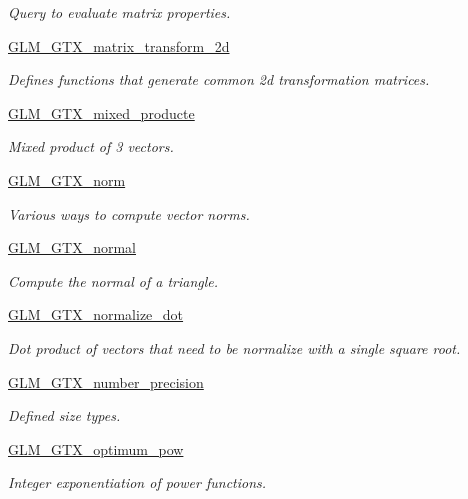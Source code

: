 \begin{DoxyCompactItemize}
\begin{DoxyCompactList}\small\item\em Query to evaluate matrix properties. \end{DoxyCompactList}\item 
\hyperlink{group__gtx__matrix__transform__2d}{G\+L\+M\+\_\+\+G\+T\+X\+\_\+matrix\+\_\+transform\+\_\+2d}
\begin{DoxyCompactList}\small\item\em Defines functions that generate common 2d transformation matrices. \end{DoxyCompactList}\item 
\hyperlink{group__gtx__mixed__product}{G\+L\+M\+\_\+\+G\+T\+X\+\_\+mixed\+\_\+producte}
\begin{DoxyCompactList}\small\item\em Mixed product of 3 vectors. \end{DoxyCompactList}\item 
\hyperlink{group__gtx__norm}{G\+L\+M\+\_\+\+G\+T\+X\+\_\+norm}
\begin{DoxyCompactList}\small\item\em Various ways to compute vector norms. \end{DoxyCompactList}\item 
\hyperlink{group__gtx__normal}{G\+L\+M\+\_\+\+G\+T\+X\+\_\+normal}
\begin{DoxyCompactList}\small\item\em Compute the normal of a triangle. \end{DoxyCompactList}\item 
\hyperlink{group__gtx__normalize__dot}{G\+L\+M\+\_\+\+G\+T\+X\+\_\+normalize\+\_\+dot}
\begin{DoxyCompactList}\small\item\em Dot product of vectors that need to be normalize with a single square root. \end{DoxyCompactList}\item 
\hyperlink{group__gtx__number__precision}{G\+L\+M\+\_\+\+G\+T\+X\+\_\+number\+\_\+precision}
\begin{DoxyCompactList}\small\item\em Defined size types. \end{DoxyCompactList}\item 
\hyperlink{group__gtx__optimum__pow}{G\+L\+M\+\_\+\+G\+T\+X\+\_\+optimum\+\_\+pow}
\begin{DoxyCompactList}\small\item\em Integer exponentiation of power functions. \end{DoxyCompactList}\item 

\end{DoxyCompactItemize}
